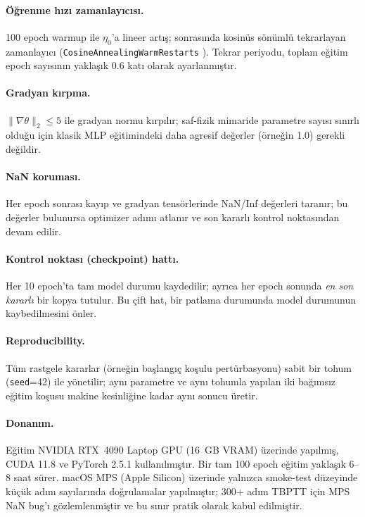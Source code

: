 \paragraph{Öğrenme hızı zamanlayıcısı.} 100 epoch warmup ile $\eta_{0}$'a lineer artış; sonrasında kosinüs sönümlü tekrarlayan zamanlayıcı (\texttt{CosineAnnealingWarmRestarts} \cite{loshchilov_sgdr_2017}). Tekrar periyodu, toplam eğitim epoch sayısının yaklaşık $0.6$ katı olarak ayarlanmıştır.

\paragraph{Gradyan kırpma.} $\|\nabla\theta\|_{2}\leq 5$ ile gradyan normu kırpılır; saf-fizik mimaride parametre sayısı sınırlı olduğu için klasik MLP eğitimindeki daha agresif değerler (örneğin 1.0) gerekli değildir.

\paragraph{NaN koruması.} Her epoch sonrası kayıp ve gradyan tensörlerinde NaN/Inf değerleri taranır; bu değerler bulunursa optimizer adımı atlanır ve son kararlı kontrol noktasından devam edilir.

\paragraph{Kontrol noktası (checkpoint) hattı.} Her 10 epoch'ta tam model durumu kaydedilir; ayrıca her epoch sonunda \emph{en son kararlı} bir kopya tutulur. Bu çift hat, bir patlama durumunda model durumunun kaybedilmesini önler.

\paragraph{Reproducibility.} Tüm rastgele kararlar (örneğin başlangıç koşulu pertürbasyonu) sabit bir tohum (\texttt{seed}=42) ile yönetilir; aynı parametre ve aynı tohumla yapılan iki bağımsız eğitim koşusu makine kesinliğine kadar aynı sonucu üretir.

\paragraph{Donanım.} Eğitim NVIDIA RTX~4090 Laptop GPU (16~GB VRAM) üzerinde yapılmış, CUDA 11.8 ve PyTorch 2.5.1 \cite{paszke_pytorch_2019} kullanılmıştır. Bir tam 100 epoch eğitim yaklaşık 6--8 saat sürer. macOS MPS (Apple Silicon) üzerinde yalnızca smoke-test düzeyinde küçük adım sayılarında doğrulamalar yapılmıştır; 300+ adım TBPTT için MPS NaN bug'ı gözlemlenmiştir ve bu sınır pratik olarak kabul edilmiştir.

